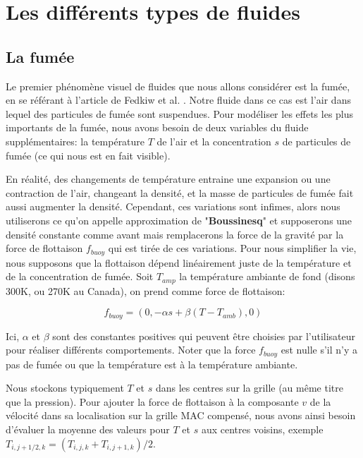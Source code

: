 \documentclass[11pt]{report}
\begin{document}
\part{Les différents types de fluides}

\chapter{La fumée}

Le premier phénomène visuel de fluides que nous allons considérer est la fumée, en se référant à l'article de Fedkiw et al. \cite{fedkiw-stam-jensen-01}. Notre fluide dans ce cas est l'air dans lequel des particules de fumée sont suspendues. Pour modéliser les effets les plus importants de la fumée, nous avons besoin de deux variables du fluide supplémentaires: la température $T$ de l'air et la concentration $s$ de particules de fumée (ce qui nous est en fait visible).\newline

En réalité, des changements de température entraine une expansion ou une contraction de l'air, changeant la densité, et la masse de particules de fumée fait aussi augmenter la densité. Cependant, ces variations sont infimes, alors nous utiliserons ce qu'on appelle approximation de "\textbf{Boussinesq}" et supposerons une densité constante comme avant mais remplacerons la force de la gravité par la force de flottaison \textit{$f_{buoy}$} qui est tirée de ces variations. Pour nous simplifier la vie, nous supposons que la flottaison dépend linéairement juste de la température et de la concentration de fumée. Soit $T_{amp}$ la température ambiante de fond (disons 300K, ou 270K au Canada), on prend comme force de flottaison:

\begin{equation}
f_{buoy} = (0, -\alpha s + \beta (T-T_{amb}) ,0)
\end{equation}

Ici, $\alpha$ et $\beta$ sont des constantes positives qui peuvent être choisies par l'utilisateur pour réaliser différents comportements. Noter que la force $f_{buoy}$ est nulle s'il n'y a pas de fumée ou que la température est à la température ambiante.\newline

Nous stockons typiquement $T$ et $s$ dans les centres sur la grille (au même titre que la pression). Pour ajouter la force de flottaison à la composante $v$ de la vélocité dans sa localisation sur la grille MAC compensé, nous avons ainsi besoin d'évaluer la moyenne des valeurs pour $T$ et $s$ aux centres voisins, exemple $T_{i, j+1/2, k} = (T_{i,j,k} + T_{i,j+1,k})/2$.\newline
\end{document}
